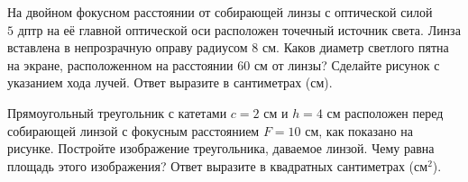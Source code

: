 \begin{taskbasic}[code={\label{task:optics_lens_light_spot_diameter}}]
На двойном фокусном расстоянии от собирающей линзы с оптической силой $5\text{ дптр}$ на её главной оптической оси расположен точечный источник света. Линза вставлена в непрозрачную оправу радиусом $8\text{ см}$. Каков диаметр светлого пятна на экране, расположенном на расстоянии $60\text{ см}$ от линзы? Сделайте рисунок с указанием хода лучей. Ответ выразите в сантиметрах (см).

\end{taskbasic}

\begin{taskbasic}[code={\label{task:optics_lens_triangle_image_area}}]
Прямоугольный треугольник с катетами $c = 2\text{ см}$ и $h = 4\text{ см}$ расположен перед собирающей линзой с фокусным расстоянием $F = 10\text{ см}$, как показано на рисунке. Постройте изображение треугольника, даваемое линзой. Чему равна площадь этого изображения? Ответ выразите в квадратных сантиметрах ($\text{см}^2$).

\nopagebreak\smallskip
\begin{center}
\end{center}

\end{taskbasic}
